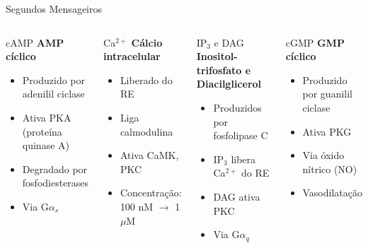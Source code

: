 \begin{frame}[shrink=10]{Segundos Mensageiros}
\begin{columns}
\begin{block}{cAMP}
\textbf{AMP cíclico}
\begin{itemize}
    \item Produzido por adenilil ciclase
    \item Ativa PKA (proteína quinase A)
    \item Degradado por fosfodiesterases
    \item Via G$\alpha_s$
\end{itemize}
\end{block}

\begin{block}{Ca$^{2+}$}
\textbf{Cálcio intracelular}
\begin{itemize}
    \item Liberado do RE
    \item Liga calmodulina
    \item Ativa CaMK, PKC
    \item Concentração: 100 nM $\rightarrow$ 1 $\mu$M
\end{itemize}
\end{block}

\begin{block}{IP$_3$ e DAG}
\textbf{Inositol-trifosfato e Diacilglicerol}
\begin{itemize}
    \item Produzidos por fosfolipase C
    \item IP$_3$ libera Ca$^{2+}$ do RE
    \item DAG ativa PKC
    \item Via G$\alpha_q$
\end{itemize}
\end{block}

\begin{block}{cGMP}
\textbf{GMP cíclico}
\begin{itemize}
    \item Produzido por guanilil ciclase
    \item Ativa PKG
    \item Via óxido nítrico (NO)
    \item Vasodilatação
\end{itemize}
\end{block}
\end{columns}
\end{frame}

